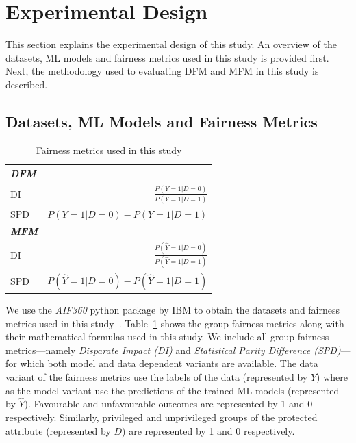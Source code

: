 \documentclass{article}
\begin{document}


\section{Experimental Design}\label{sec:method}
This section explains the experimental design of this study. An
overview of the datasets, ML models and fairness metrics used in this
study is provided first. Next, the methodology used to evaluating DFM and
MFM in this study is described.

\subsection{Datasets, ML Models and Fairness Metrics}\label{sec:method-parameters}

\begin{table}
  \centering
  \begin{tabular}{l r}
    \toprule
    \textbf{\emph{DFM}}\\
    \midrule
    DI & \(\displaystyle \frac{P(Y=1|D=0)}{P(Y=1|D=1)}\)\\
    SPD & \(\displaystyle P(Y=1|D=0)-P(Y=1|D=1)\)\\
    \midrule
    \textbf{\emph{MFM}}\\
    \midrule
    DI & \(\displaystyle \frac{P(\hat{Y}=1|D=0)}{P(\hat{Y}=1|D=1)}\)\\
    SPD & \(\displaystyle P(\hat{Y}=1|D=0)-P(\hat{Y}=1|D=1)\)\\
    \bottomrule
  \end{tabular}
  \caption{Fairness metrics used in this study}
  \label{tab:fairness-metrics}
\end{table}

We use the \emph{AIF360} python package by IBM to obtain the datasets
and fairness metrics used in this
study \cite{bellamy2019ai}. Table \ref{tab:fairness-metrics} shows the
group fairness metrics along with their mathematical formulas used in
this study. We include all group fairness metrics---namely
\emph{Disparate Impact (DI)} and \emph{Statistical Parity Difference
(SPD)}---for which both model and data dependent variants are
available. The data variant of the fairness metrics use the labels of
the data (represented by $Y$) where as the model variant use the
predictions of the trained ML models (represented by
$\hat{Y}$). Favourable and unfavourable outcomes are represented by
1 and 0 respectively. Similarly, privileged and unprivileged groups of
the protected attribute (represented by $D$) are represented by
1 and 0 respectively.
\end{document}
